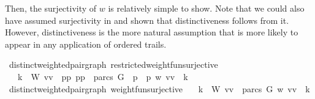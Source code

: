 \begin{isabellebody}
\begin{isamarkuptext}
Then, the surjectivity of $w$ is relatively simple to show. Note that we could also have assumed surjectivity in 
 and shown that distinctiveness follows from it. However,
distinctiveness is the more natural assumption that is more likely to appear in any application
of ordered trails.%
\end{isamarkuptext}\isamarkuptrue%
\isamarkupfalse%
{\isacharparenleft}\ distinct{\isacharunderscore}weighted{\isacharunderscore}pair{\isacharunderscore}graph{\isacharparenright}\ restricted{\isacharunderscore}weight{\isacharunderscore}fun{\isacharunderscore}surjective{\isacharcolon}\ \ \isanewline
\ \ \ {\isachardoublequoteopen}{\isasymforall}k\ {\isasymin}\ W{\isachardot}\ {\isasymexists}{\isacharparenleft}vv\ {\isasymin}\ {\isacharbraceleft}{\isacharparenleft}p{}{\isacharcomma}p{}{\isacharparenright}{\isachardot}\ {\isacharparenleft}p{}{\isacharcomma}p{}{\isacharparenright}\ {\isasymin}\ {\isacharparenleft}parcs\ G{\isacharparenright}\ {\isasymand}\ p{}\ {\isacharless}\ p{}{\isacharbraceright}{\isachardot}\ w\ {\isacharparenleft}vv\ {\isacharequal}\ k{\isachardoublequoteclose}%
\isadelimproof
%
\endisadelimproof
%
\isatagproof
%
\endisatagproof
{\isafoldproof}%
%
\isadelimproof
%
\endisadelimproof
\isanewline
{}\isamarkupfalse%
{\isacharparenleft}\ distinct{\isacharunderscore}weighted{\isacharunderscore}pair{\isacharunderscore}graph{\isacharparenright}\ weight{\isacharunderscore}fun{\isacharunderscore}surjective{\isacharcolon}\isanewline
\ \ \ {\isachardoublequoteopen}{\isacharparenleft}{\isasymforall}k\ {\isasymin}\ W{\isachardot}\ {\isasymexists}{\isacharparenleft}vv\ {\isasymin}\ {\isacharparenleft}parcs\ G{\isacharparenright}{\isachardot}\ w\ {\isacharparenleft}vv\ {\isacharequal}\ k{\isacharparenright}{\isachardoublequoteclose}%
\isadelimproof
%
\endisadelimproof
%
\isatagproof
%
\endisatagproof
{\isafoldproof}%
%
\isadelimproof
%
\endisadelimproof
%
\isadelimproof
%
\endisadelimproof
%
\isatagproof
%
\endisatagproof
{\isafoldproof}%

\end{isabellebody}
